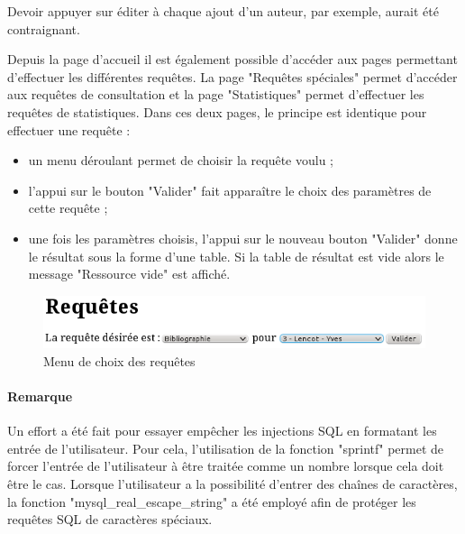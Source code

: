 \documentclass[12pt]{article}
\begin{document}
Devoir appuyer sur éditer à chaque ajout d'un auteur, par exemple, aurait été
contraignant.

Depuis la page d'accueil il est également possible d'accéder aux pages
permettant d'effectuer les différentes requêtes. La page "Requêtes spéciales"
permet d'accéder aux requêtes de consultation et la page "Statistiques" permet
d'effectuer les requêtes de statistiques. Dans ces deux pages, le principe est
identique pour effectuer une requête : 
\begin{itemize}
	\item un menu déroulant permet de choisir la requête voulu ;
	\item l'appui sur le bouton "Valider" fait apparaître le choix des paramètres de cette
		requête ;
	\item une fois les paramètres choisis, l'appui sur le nouveau bouton
		"Valider" donne le résultat sous la forme d'une table. Si la table de
		résultat est vide alors le message "Ressource vide" est affiché.
\end{itemize}

\begin{figure}[h!]
\begin{center}
\noindent\includegraphics[]{choix-requete}
  \caption{Menu de choix des requêtes}
\end{center}
\end{figure}

\paragraph{Remarque}
Un effort a été fait pour essayer empêcher les injections SQL en formatant
les entrée de l'utilisateur. Pour cela, l'utilisation de la fonction "sprintf"
permet de forcer l'entrée de l'utilisateur à être traitée comme un nombre
lorsque cela doit être le cas. Lorsque l'utilisateur a la possibilité
d'entrer des chaînes de caractères, la fonction "mysql\_real\_escape\_string"
a été employé afin de protéger les requêtes SQL de caractères spéciaux.
\end{document}
